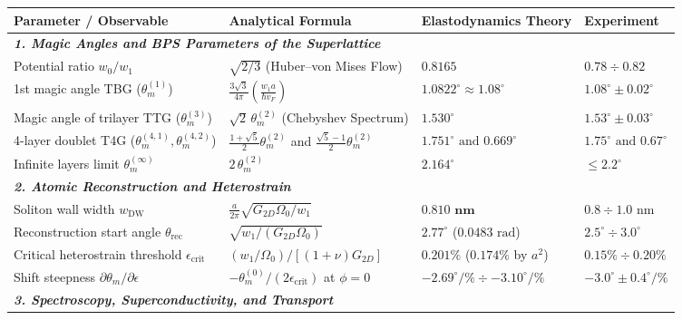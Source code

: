 \documentclass[12pt,a4paper]{article}
\begin{document}
\begin{table}[H]
\centering
\footnotesize
\setlength{\tabcolsep}{3pt}
\renewcommand{\arraystretch}{1.25}
\begin{tabularx}{\textwidth}{p{3.4cm} p{5.2cm} p{3.8cm} >{\raggedleft\arraybackslash}X}
\toprule
\textbf{Parameter / Observable} & \textbf{Analytical Formula} & \textbf{Elastodynamics Theory} & \textbf{Experiment} \\
\midrule
\multicolumn{4}{l}{\textit{\textbf{1. Magic Angles and BPS Parameters of the Superlattice}}} \\
Potential ratio $w_0/w_1$ & $\sqrt{2/3}$ (Huber--von Mises Flow) & $\mathbf{0.8165}$ & $0.78 \div 0.82$ \\
1st magic angle TBG ($\theta_m^{(1)}$) & $\frac{3\sqrt{3}}{4\pi} (\frac{w_1 a}{\hbar v_F})$ & $\mathbf{1.0822^\circ \approx 1.08^\circ}$ & $1.08^\circ \pm 0.02^\circ$ \\
Magic angle of trilayer TTG ($\theta_m^{(3)}$) & $\sqrt{2} \, \theta_m^{(2)}$ (Chebyshev Spectrum) & $\mathbf{1.530^\circ}$ & $1.53^\circ \pm 0.03^\circ$ \\
4-layer doublet T4G ($\theta_m^{(4,1)}, \theta_m^{(4,2)}$) & $\frac{1+\sqrt{5}}{2}\theta_m^{(2)}$ and $\frac{\sqrt{5}-1}{2}\theta_m^{(2)}$ & $\mathbf{1.751^\circ} \text{ and } \mathbf{0.669^\circ}$ & $1.75^\circ \text{ and } 0.67^\circ$ \\
Infinite layers limit $\theta_m^{(\infty)}$ & $2 \, \theta_m^{(2)}$ & $\mathbf{2.164^\circ}$ & $\le 2.2^\circ$ \\
\midrule
\multicolumn{4}{l}{\textit{\textbf{2. Atomic Reconstruction and Heterostrain}}} \\
Soliton wall width $w_{\text{DW}}$ & $\frac{a}{2\pi}\sqrt{G_{2D}\Omega_0 / w_1}$ & $\mathbf{0.810\text{ nm}}$ & $0.8 \div 1.0\text{ nm}$ \\
Reconstruction start angle $\theta_{\text{rec}}$ & $\sqrt{w_1 / (G_{2D}\Omega_0)}$ & $\mathbf{2.77^\circ}$ ($0.0483\text{ rad}$) & $2.5^\circ \div 3.0^\circ$ \\
Critical heterostrain threshold $\epsilon_{\text{crit}}$ & $(w_1 / \Omega_0) / [(1+\nu) G_{2D}]$ & $\mathbf{0.201\%}$ ($0.174\%$ by $a^2$) & $0.15\% \div 0.20\%$ \\Shift steepness $\partial\theta_m / \partial\epsilon$ & $-\theta_m^{(0)} / (2\epsilon_{\text{crit}})$ at $\phi=0$ & $\mathbf{-2.69^\circ / \%} \div \mathbf{-3.10^\circ / \%}$ & $-3.0^\circ \pm 0.4^\circ / \%$ \\
\midrule
\multicolumn{4}{l}{\textit{\textbf{3. Spectroscopy, Superconductivity, and Transport}}} \\

\end{tabularx}
\end{table}
\end{document}
